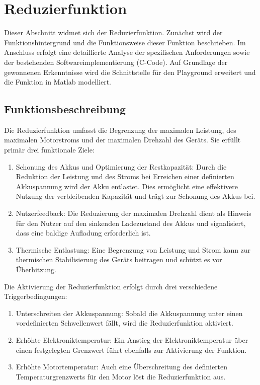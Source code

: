 \section{Reduzierfunktion}
Dieser Abschnitt widmet sich der Reduzierfunktion. Zunächst wird der Funktionshintergrund und die Funktionsweise dieser Funktion beschrieben. Im Anschluss erfolgt eine detaillierte Analyse der spezifischen Anforderungen sowie der bestehenden Softwareimplementierung (C-Code). Auf Grundlage der gewonnenen Erkenntnisse wird die Schnittstelle für den Playground erweitert und die Funktion in Matlab modelliert.

\subsection{Funktionsbeschreibung}
Die Reduzierfunktion umfasst die Begrenzung der maximalen Leistung, des maximalen Motorstroms und der maximalen Drehzahl des Geräts. Sie erfüllt primär drei funktionale Ziele:
\begin{enumerate}
\item Schonung des Akkus und Optimierung der Restkapazität: Durch die Reduktion der Leistung und des Stroms bei Erreichen einer definierten Akkuspannung wird der Akku entlastet. Dies ermöglicht eine effektivere Nutzung der verbleibenden Kapazität und trägt zur Schonung des Akkus bei.
\item Nutzerfeedback: Die Reduzierung der maximalen Drehzahl dient als Hinweis für den Nutzer auf den sinkenden Ladezustand des Akkus und signalisiert, dass eine baldige Aufladung erforderlich ist.
\item Thermische Entlastung: Eine Begrenzung von Leistung und Strom kann zur thermischen Stabilisierung des Geräts beitragen und schützt es vor Überhitzung.
\end{enumerate}
Die Aktivierung der Reduzierfunktion erfolgt durch drei verschiedene Triggerbedingungen:
\begin{enumerate}
\item Unterschreiten der Akkuspannung: Sobald die Akkuspannung unter einen vordefinierten Schwellenwert fällt, wird die Reduzierfunktion aktiviert.
\item Erhöhte Elektroniktemperatur: Ein Anstieg der Elektroniktemperatur über einen festgelegten Grenzwert führt ebenfalls zur Aktivierung der Funktion.
\item Erhöhte Motortemperatur: Auch eine Überschreitung des definierten Temperaturgrenzwerts für den Motor löst die Reduzierfunktion aus.
\end{enumerate}
